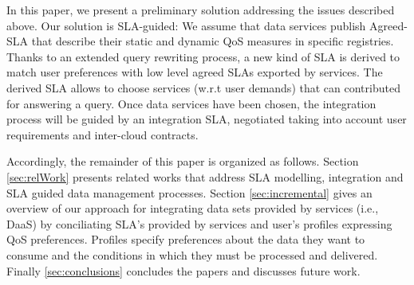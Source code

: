  In this paper, we present  a preliminary solution addressing the issues described above.  Our solution is SLA-guided: We assume that data services publish Agreed-SLA that describe their  static and dynamic QoS measures in specific registries.  Thanks to an extended query rewriting process, a new kind of SLA is derived to match user preferences with low level agreed SLAs exported by services. The derived SLA allows to choose  services (w.r.t user demands) that can contributed for answering a query. Once data services have been chosen, the integration process will be guided by an integration SLA, negotiated taking into account user requirements and inter-cloud contracts.

 
 \color{red}
Accordingly, the remainder of this paper is organized as follows. Section \ref{sec:relWork} presents related works that address SLA modelling, integration and SLA guided data management processes. Section \ref{sec:incremental} gives an overview of our approach for integrating data sets provided by services (i.e., DaaS) by conciliating SLA's provided by services and user's profiles expressing QoS preferences. Profiles specify preferences about the data they want to consume and the conditions in which they must be processed and delivered. 
Finally \ref{sec:conclusions} concludes the papers and discusses future work.

\color{black}
